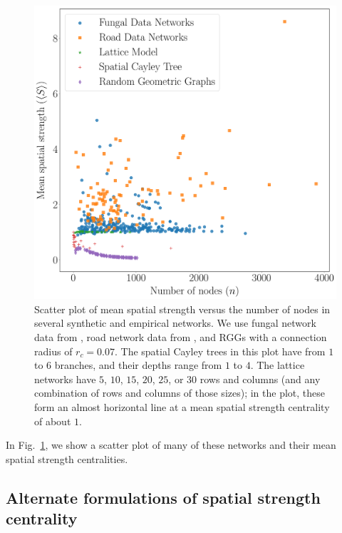 \documentclass[%
 reprint,
 amsmath,amssymb,
 aps,
]{revtex4-1}
\begin{document}
\begin{figure}
    \centering
    \includegraphics[width=1.0\linewidth]{spatial_scatter_1.pdf}
    \caption{Scatter plot of mean spatial strength versus the number of nodes in several synthetic and empirical networks. We use fungal network data from \cite{fungal_data}, road network data from \cite{road_data}, and RGGs with a connection radius of $r_c = 0.07$. The spatial Cayley trees in this plot have from $1$ to $6$ branches, and their depths range from $1$ to $4$. The lattice networks have $5$, $10$, $15$, $20$, $25$, or $30$ rows and columns (and any combination of rows and columns of those sizes); in the plot, these form an almost horizontal line at a mean spatial strength centrality of about $1$.
    }
    \label{fig:spatial_distributions}
\end{figure}


In Fig.~\ref{fig:spatial_distributions}, we show a scatter plot of many of these networks and their mean spatial strength centralities.


\subsection{Alternate formulations of spatial strength centrality}\label{sec:alternate_formations}
\end{document}
